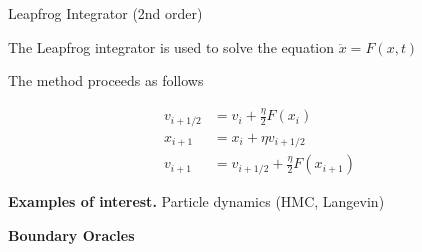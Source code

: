 \documentclass[10pt]{beamer}
\begin{document}
\begin{frame}{Leapfrog Integrator (2nd order)}

The Leapfrog integrator is used to solve the equation $\ddot x = F(x, t)$ 

\medskip

The method proceeds as follows

\begin{align*}
    v_{i + 1/2} & = v_i + \frac \eta 2 F(x_i) \\
    x_{i + 1} & = x_i + \eta v_{i + 1 /2} \\
    v_{i + 1} & = v_{i + 1/2} + \frac \eta 2 F(x_{i + 1})
\end{align*}

\textbf{Examples of interest.} Particle dynamics (HMC, Langevin)

\end{frame}


\begin{frame}{}
    \vfill
    \centering
    \Large 
    \textbf{Boundary Oracles}
    \vfill
    
\end{frame}
\end{document}
